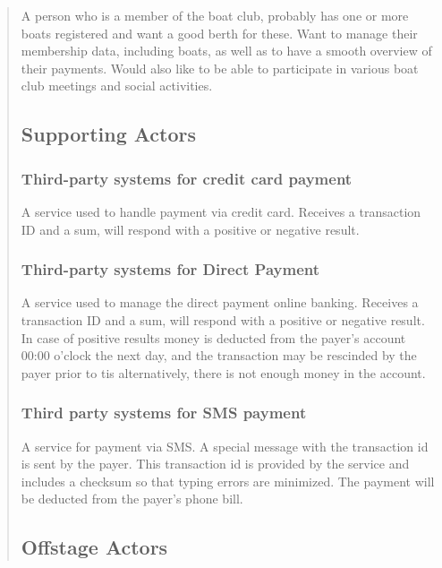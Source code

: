 \begin{quote}
A person who is a member of the boat club, probably has one or more
boats registered and want a good berth for these. Want to manage their
membership data, including boats, as well as to have a smooth overview
of their payments. Would also like to be able to participate in various
boat club meetings and social activities.

\subsection{Supporting Actors}\label{supporting-actors}

\subsubsection{Third-party systems for credit card
payment}\label{third-party-systems-for-credit-card-payment}

A service used to handle payment via credit card. Receives a transaction
ID and a sum, will respond with a positive or negative result.

\subsubsection{Third-party systems for Direct
Payment}\label{third-party-systems-for-direct-payment}

A service used to manage the direct payment online banking. Receives a
transaction ID and a sum, will respond with a positive or negative
result. In case of positive results money is deducted from the payer's
account 00:00 o'clock the next day, and the transaction may be rescinded
by the payer prior to tis alternatively, there is not enough money in
the account.

\subsubsection{Third party systems for SMS
payment}\label{third-party-systems-for-sms-payment}

A service for payment via SMS. A special message with the transaction id
is sent by the payer. This transaction id is provided by the service and
includes a checksum so that typing errors are minimized. The payment
will be deducted from the payer's phone bill.

\subsection{Offstage Actors}\label{offstage-actors}


\end{quote}
